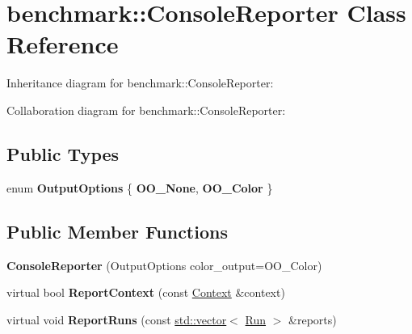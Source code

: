 \hypertarget{classbenchmark_1_1_console_reporter}{}\section{benchmark\+:\+:Console\+Reporter Class Reference}
\label{classbenchmark_1_1_console_reporter}


Inheritance diagram for benchmark\+:\+:Console\+Reporter\+:


Collaboration diagram for benchmark\+:\+:Console\+Reporter\+:
\subsection*{Public Types}
\begin{DoxyCompactItemize}
\item 
\mbox{\label{classbenchmark_1_1_console_reporter_ae1dc9c16b67b70e2c85ef1f5104cb4e0}} 
enum {\bfseries Output\+Options} \{ {\bfseries O\+O\+\_\+\+None}, 
{\bfseries O\+O\+\_\+\+Color}
 \}
\end{DoxyCompactItemize}
\subsection*{Public Member Functions}
\begin{DoxyCompactItemize}
\item 
\mbox{\label{classbenchmark_1_1_console_reporter_a8b6b8ebde725a0581dd9a7b73d974bdf}} 
{\bfseries Console\+Reporter} (Output\+Options color\+\_\+output=O\+O\+\_\+\+Color)
\item 
\mbox{\label{classbenchmark_1_1_console_reporter_a368bd56e289bbae744a14c972e4d21bb}} 
virtual bool {\bfseries Report\+Context} (const \mbox{\hyperlink{structbenchmark_1_1_benchmark_reporter_1_1_context}{Context}} \&context)
\item 
\mbox{\label{classbenchmark_1_1_console_reporter_a61695042de6301a3249688812f154cf4}} 
virtual void {\bfseries Report\+Runs} (const \mbox{\hyperlink{classstd_1_1vector}{std\+::vector}}$<$ \mbox{\hyperlink{structbenchmark_1_1_benchmark_reporter_1_1_run}{Run}} $>$ \&reports)
\end{DoxyCompactItemize}
